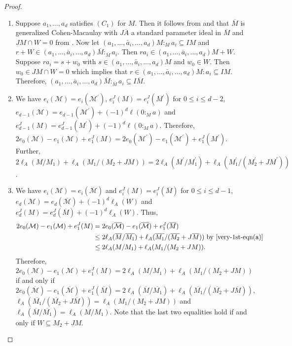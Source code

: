 \documentclass[11pt,reqno]{amsart}
\theoremstyle{definition}
\def\M{{\mathcal M}}
\numberwithin{equation}{section}
\begin{document}
\begin{proof}
	\begin{enumerate}[label=(\roman*)]
		\item
		Suppose $a_1,\ldots,a_d$ satisfies  $(C_1)$ for $M$. Then it follows from \cite[Theorem 2.1]{trung-gcm} and \cite[Lemma 1.6]{trung-gcm} that $\overline{M}$ is generalized Cohen-Macaulay with $J\overline{A}$ a standard parameter ideal in $\overline{M}$ and $JM\cap W=0$ from \cite[Corollary 2.3]{trung-gcm}. Now let  $(a_1,\ldots,\check{a_i},\ldots,a_d)M:_M a_i\subseteq IM$ and $r+W\in (a_1,\ldots,\check{a_i},\ldots,a_d)\overline{M}:_{\overline{M}} a_i$.  Then $ra_i\in (a_1,\ldots,\check{a_i},\ldots,a_d)M+W$. Suppose $ra_i=s+w_0$ with $s\in (a_1,\ldots,\check{a_i},\ldots,a_d)M$ and $w_0\in W$. Then
		$w_0\in JM\cap W=0$ which implies that $ r\in (a_1,\ldots,\check{a_i},\ldots,a_d)M: a_i\subseteq IM.$ Therefore,   $(a_1,\ldots,\check{a_i},\ldots,a_d)\overline{M}:_{\overline{M}} a_i \subseteq I\overline{M}.$
        \vspace{0.25cm}
        
		\item We have $e_i(\M)=e_i(\M^\prime)$, $e_i^J(M)=e_i^J(M^\prime)$ for $0\leq i\leq d-2$, $e_{d-1}(\M)=e_{d-1}(\M^\prime)+(-1)^d\ell(0:_M a)$ and $e_{d-1}^J(M)=e_{d-1}^J(M^\prime)+(-1)^d\ell(0:_M a)$. Therefore, $2e_0(\M)-e_1(\M)+e_1^J(M)= 2e_0(\M^\prime)-e_1(\M^\prime)+e_1^J(M^\prime)$. Further, $2\ell_A(M/M_1)+\ell_A(M_1/(M_2+JM))=2\ell_{A}(M^\prime/M_1^\prime)+\ell_{A}(M_1^\prime/(M_2^\prime+JM^\prime))$.

         \vspace{0.25cm}
		\item 
		We have $e_i(\M)=e_i(\overline{\M})$ and $e_i^J(M)=e_i^J(\overline{M})$ for $0\leq i\leq d-1$, $e_d(\M)=e_d(\overline{\M})+(-1)^d\ell_A(W)$ and $e_d^J(M)=e_d^J(\overline{M})+(-1)^d\ell_A(W)$. Thus,
		\begin{align*}
			2e_0(\M)-e_1(\M)+e_1^J(M)&= 2e_0(\overline{\M})-e_1(\overline{\M})+e_1^J(\overline{M})\\
			&\leq 2\ell_A(\overline{M}/\overline{M_1})+\ell_A(\overline{M_1}/(\overline{M_2}+J\overline{M})) \mbox{ by \eqref {very-1st-eqn(a)}}\\
			&\leq 2\ell_A(M/M_1)+\ell_A(M_1/(M_2+JM)).
		\end{align*}
		Therefore, $2e_0(\M)-e_1(\M)+e_1^J(M)= 2\ell_A(M/M_1)+\ell_A(M_1/(M_2+JM))$ if and only if $2e_0(\overline{\M})-e_1(\overline{\M})+e_1^J(\overline{M})=2\ell_A(\overline{M}/\overline{M_1})+\ell_A(\overline{M_1}/(\overline{M_2}+J\overline{M})),$ $\ell_A(\overline{M_1}/(\overline{M_2}+J\overline{M}))=\ell_A(M_1/(M_2+JM))$  and $\ell_A(\overline{M}/\overline{M_1})=\ell_A(M/M_1)$. 
		Note that the last two equalities hold if and only if $W\subseteq M_2+JM$. \qedhere
	\end{enumerate}
\end{proof}
\end{document}
